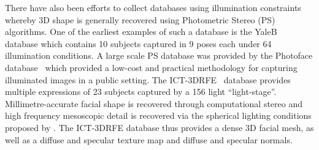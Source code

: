 There have also been efforts to collect databases using illumination constraints
whereby 3D shape is generally recovered using Photometric Stereo (PS) 
algorithms. One of the earliest examples of such a database is the 
YaleB~\cite{RefWorks:314} database which contains 10 subjects captured in 
9 poses each under 64 illumination conditions. A large scale PS database was
provided by the Photoface database~\cite{RefWorks:293} which provided a low-cost
and practical methodology for capturing illuminated images in a public setting.
The ICT-3DRFE~\cite{stratou2012exploring} database provides multiple expressions
of 23 subjects captured by a 156 light ``light-stage''. Millimetre-accurate
facial shape is recovered through computational stereo and high frequency 
mesoscopic detail is recovered via the spherical lighting conditions proposed
by \citet{ma2007rapid}. The ICT-3DRFE database thus provides a dense 
3D facial mesh, as well as a diffuse and specular texture map and diffuse and
specular normals.

